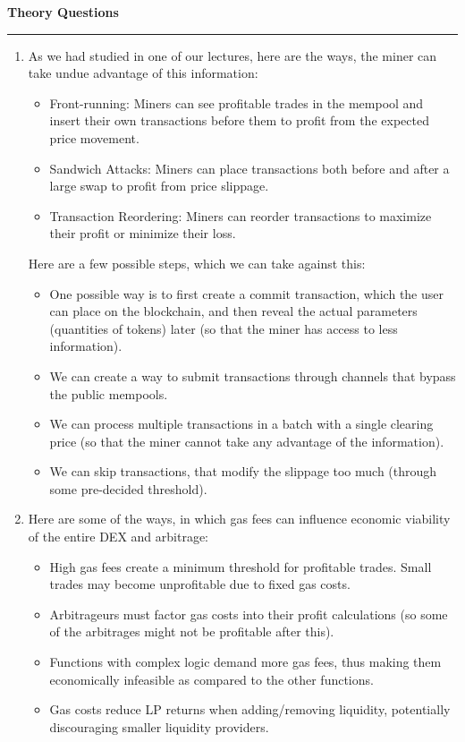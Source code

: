 \documentclass[a4paper]{article}
\newenvironment{solution}[2][]{%
\begin{mdframed}[linecolor=blue!70!black, linewidth=2pt, roundcorner=10pt, backgroundcolor=yellow!10!white, skipabove=12pt, skipbelow=12pt]%
	\textbf{\large #2}
	\par\noindent\rule{\textwidth}{0.4pt}
}{
\end{mdframed}
}
\begin{document}
\begin{solution}{Theory Questions}
\begin{enumerate}
	\item As we had studied in one of our lectures, here are the ways, the miner can take undue advantage of this information:
	\begin{itemize}
		\item Front-running: Miners can see profitable trades in the mempool and insert their own transactions before them to profit from the expected price movement.
		\item Sandwich Attacks: Miners can place transactions both before and after a large swap to profit from price slippage.
		\item Transaction Reordering: Miners can reorder transactions to maximize their profit or minimize their loss.
	\end{itemize}
	Here are a few possible steps, which we can take against this:
	\begin{itemize}
		\item One possible way is to first create a commit transaction, which the user can place on the blockchain, and then reveal the actual parameters (quantities of tokens) later (so that the miner has access to less information).
		\item We can create a way to submit transactions through channels that bypass the public mempools.
		\item We can process multiple transactions in a batch with a single clearing price (so that the miner cannot take any advantage of the information).
		\item We can skip transactions, that modify the slippage too much (through some pre-decided threshold).
	\end{itemize}

	\item Here are some of the ways, in which gas fees can influence economic viability of the entire DEX and arbitrage:
	\begin{itemize}
		\item High gas fees create a minimum threshold for profitable trades. Small trades may become unprofitable due to fixed gas costs.
		\item Arbitrageurs must factor gas costs into their profit calculations (so some of the arbitrages might not be profitable after this).
		\item Functions with complex logic demand more gas fees, thus making them economically infeasible as compared to the other functions.
		\item Gas costs reduce LP returns when adding/removing liquidity, potentially discouraging smaller liquidity providers.
	\end{itemize}


\end{enumerate}
\end{solution}
\end{document}

